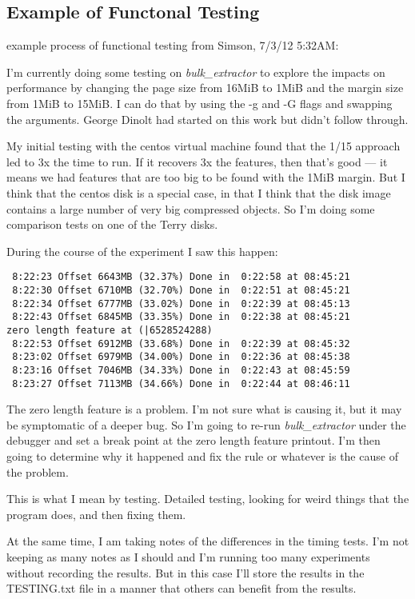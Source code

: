 \documentclass[10pt,twoside]{article}
\newcommand{\bulk}{\emph{bulk\_extractor}\xspace}
\begin{document}
\subsection{Example of Functonal Testing}example process of functional testing from Simson, 7/3/12 5:32AM:

I'm currently doing some testing on \bulk to explore the impacts on performance by changing the page size from 16MiB to 1MiB and the margin size from 1MiB to 15MiB. I can do that by using the -g and -G flags and swapping the arguments. George Dinolt had started on this work but didn't follow through.

My initial testing with the centos virtual machine found that the 1/15 approach led to 3x the time to run. If it recovers 3x the features, then that's good --- it means we had features that are too big to be found with the 1MiB margin. But I think that the centos disk is a special case, in that I think that the disk image contains a large number of very big compressed objects.  So I'm doing some comparison tests on one of the Terry disks.

During the course of the experiment I saw this happen:

\begin{verbatim}
 8:22:23 Offset 6643MB (32.37%) Done in  0:22:58 at 08:45:21
 8:22:30 Offset 6710MB (32.70%) Done in  0:22:51 at 08:45:21
 8:22:34 Offset 6777MB (33.02%) Done in  0:22:39 at 08:45:13
 8:22:43 Offset 6845MB (33.35%) Done in  0:22:38 at 08:45:21
zero length feature at (|6528524288)
 8:22:53 Offset 6912MB (33.68%) Done in  0:22:39 at 08:45:32
 8:23:02 Offset 6979MB (34.00%) Done in  0:22:36 at 08:45:38
 8:23:16 Offset 7046MB (34.33%) Done in  0:22:43 at 08:45:59
 8:23:27 Offset 7113MB (34.66%) Done in  0:22:44 at 08:46:11
\end{verbatim}


The zero length feature is a problem. I'm not sure what is causing it, but it may be symptomatic of a deeper bug. So I'm going to re-run \bulk under the debugger and set a break point at the zero length feature printout. I'm then going to determine why it happened and fix the rule or whatever is the cause of the problem.

This is what I mean by testing. Detailed testing, looking for weird things that the program does, and then fixing them. 

At the same time, I am taking notes of the differences in the timing tests. I'm not keeping as many notes as I should and I'm running too many experiments without recording the results. But in this case I'll store the results in the TESTING.txt file in a manner that others can benefit from the results.
\end{document}

